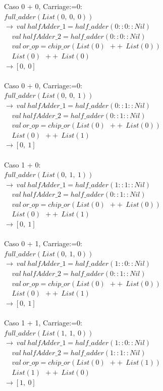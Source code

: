 \documentclass[12pt, a4paper]{article}
\begin{document}
Caso 0 + 0, Carriage:=0:\\
$full\_adder(List(0,~0,~0))$\\
$\rightarrow~val~halfAdder\_1 = half\_adder(0::0::Nil)$ \\
$~~~~~val~halfAdder\_2 = half\_adder(0::0::Nil)$ \\
$~~~~~val~or\_op = chip\_or(List(0)~~++~~List(0))$ \\
$~~~~~List(0)~~++~~List(0)$ \\
$\rightarrow [0,~0]$\\ \\
Caso 0 + 0, Carriage:=0:\\
$full\_adder(List(0,~0,~1))$\\
$\rightarrow~val~halfAdder\_1 = half\_adder(0::1::Nil)$ \\
$~~~~~val~halfAdder\_2 = half\_adder(0::1::Nil)$ \\
$~~~~~val~or\_op = chip\_or(List(0)~~++~~List(0))$ \\
$~~~~~List(0)~~++~~List(1)$ \\ 
$\rightarrow [0,~1]$\\ \\
Caso 1 + 0:\\
$full\_adder(List(0,~1,~1))$\\
$\rightarrow~val~halfAdder\_1 = half\_adder(1::1::Nil)$ \\
$~~~~~val~halfAdder\_2 = half\_adder(0::1::Nil)$ \\
$~~~~~val~or\_op = chip\_or(List(0)~~++~~List(0))$ \\
$~~~~~List(0)~~++~~List(1)$ \\ 
$\rightarrow [0,~1]$\\ \\
Caso 0 + 1, Carriage:=0:\\
$full\_adder(List(0,~1,~0))$\\
$\rightarrow~val~halfAdder\_1 = half\_adder(1::0::Nil)$ \\
$~~~~~val~halfAdder\_2 = half\_adder(0::1::Nil)$ \\
$~~~~~val~or\_op = chip\_or(List(0)~~++~~List(0))$ \\
$~~~~~List(0)~~++~~List(1)$ \\
$\rightarrow [0,~1]$\\ \\

Caso 1 + 1, Carriage:=0:\\
$full\_adder(List(1,~1,~0))$\\
$\rightarrow~val~halfAdder\_1 = half\_adder(1::0::Nil)$ \\
$~~~~~val~halfAdder\_2 = half\_adder(1::1::Nil)$ \\
$~~~~~val~or\_op = chip\_or(List(0)~~++~~List(1))$ \\
$~~~~~List(1)~~++~~List(0)$ \\
$\rightarrow [1,~0]$\\ \\
\end{document}
